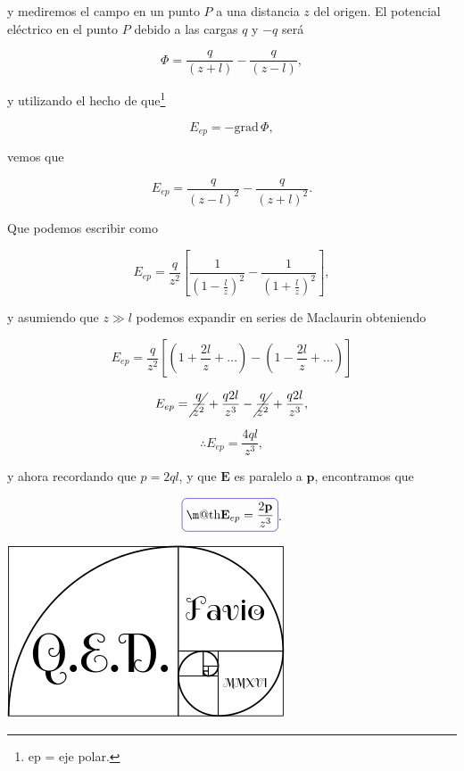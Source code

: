 \documentclass[a4paper,11pt]{article}
\makeatletter
\numberwithin{equation}{section}
\newcommand*{\boxcolor}{blue}
\renewcommand{\boxed}[1]{\textcolor{\boxcolor}{%
\tikz[baseline={([yshift=-1ex]current bounding box.center)}] \node [rectangle, minimum width=1ex,rounded corners,draw] {\normalcolor\m@th$\displaystyle#1$};}}
\makeatother
\begin{document}
y mediremos el campo en un punto $P$ a una distancia $z$ del origen. El potencial 
eléctrico en el punto $P$ debido a las cargas $q$ y $-q$ será 

\begin{equation}
 \Phi = \frac{q}{(z + l)} - \frac{q}{(z - l)},
\end{equation}

y utilizando el hecho de que\footnote{ep = eje polar.} 

\begin{equation}
 E_{ep} = - \text{grad} \, \Phi,
\end{equation}

vemos que 

\begin{equation}
 E_{ep} = \frac{q}{(z - l)^2} - \frac{q}{(z + l)^2}.
\end{equation}

Que podemos escribir como 

\begin{equation}
 E_{ep} = \frac{q}{z^2}\left[\frac{1}{\left(1 - \frac{l}{z}\right)^2} - 
 \frac{1}{\left(1 + \frac{l}{z}\right)^2}\right],
\end{equation}

y asumiendo que $z \gg l$ podemos expandir en series de Maclaurin obteniendo 

\begin{equation}
 E_{ep} = \frac{q}{z^2}\left[\left(1 + \frac{2l}{z} + \dots \right) - 
 \left(1 - \frac{2l}{z} + \dots \right) \right]
\end{equation}

\begin{equation}
 E_{ep} = \cancel{\frac{q}{z^2}} + \frac{q2l}{z^3} - \cancel{\frac{q}{z^2}} +
 \frac{q2l}{z^3},
\end{equation}

\begin{equation}
 \therefore E_{ep} = \frac{4ql}{z^3},
\end{equation}

y ahora recordando que $p = 2ql$, y que $\mathbf{E}$ es paralelo a $\mathbf{p}$, 
encontramos que 

\begin{equation}
 \boxed{\mathbf{E}_{ep} = \frac{2\mathbf{p}}{z^3}}.
\end{equation}

\hspace{10cm}\includegraphics[scale=0.25]{logoQED}
\end{document}
